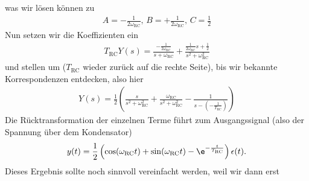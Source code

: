 \begin{Loesung}
\begin{itemize}
was wir lösen können zu
\begin{align}
A = -\frac{1}{2\omega_\mathrm{RC}},\,B = +\frac{1}{2\omega_\mathrm{RC}},\,C = \frac{1}{2}
\end{align}
Nun setzen wir die Koeffizienten ein
\begin{align}
T_\mathrm{RC} Y(s) = \frac{-\frac{1}{2\omega_\mathrm{RC}}}{s+\omega_\mathrm{RC}} + \frac{\frac{1}{2\omega_\mathrm{RC}} s + \frac{1}{2}}{s^2+\omega_\mathrm{RC}^2}
\end{align}
und stellen um ($T_\mathrm{RC}$ wieder zurück auf die rechte Seite),
bis wir bekannte Korrespondenzen entdecken, also hier
\begin{align}
Y(s) = \frac{1}{2} \left(
\frac{s}{s^2+\omega_\mathrm{RC}^2} + \frac{\omega_\mathrm{RC}}{s^2+\omega_\mathrm{RC}^2} - \frac{1}{s-(-\frac{1}{T_\mathrm{RC}})}
\right)
\end{align}
%
Die Rücktransformation der einzelnen Terme führt zum Ausgangssignal (also der
Spannung über dem Kondensator)
\begin{align}
  y(t) = \frac{1}{2}\left(
  \cos(\omega_\mathrm{RC} t) + \sin(\omega_\mathrm{RC} t) - \e^{-\frac{t}{T_\mathrm{RC}}}
  \right) \epsilon(t).
\end{align}
Dieses Ergebnis sollte noch sinnvoll vereinfacht werden, weil wir dann erst

\end{itemize}
\end{Loesung}

